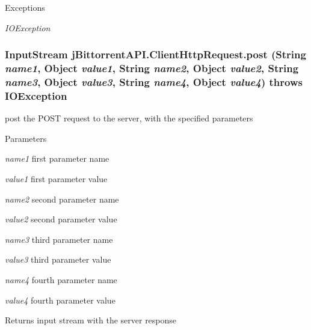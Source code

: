 \begin{DoxyExceptions}{Exceptions}
\item[{\em IOException}]\end{DoxyExceptions}
\hypertarget{classj_bittorrent_a_p_i_1_1_client_http_request_a56aa948898030309cc3989b6b57fcea7}{
\subsubsection[{post}]{\setlength{\rightskip}{0pt plus 5cm}InputStream jBittorrentAPI.ClientHttpRequest.post (String {\em name1}, \/  Object {\em value1}, \/  String {\em name2}, \/  Object {\em value2}, \/  String {\em name3}, \/  Object {\em value3}, \/  String {\em name4}, \/  Object {\em value4})  throws IOException }}
\label{classj_bittorrent_a_p_i_1_1_client_http_request_a56aa948898030309cc3989b6b57fcea7}
post the POST request to the server, with the specified parameters 
\begin{DoxyParams}{Parameters}
\item[{\em name1}]first parameter name \item[{\em value1}]first parameter value \item[{\em name2}]second parameter name \item[{\em value2}]second parameter value \item[{\em name3}]third parameter name \item[{\em value3}]third parameter value \item[{\em name4}]fourth parameter name \item[{\em value4}]fourth parameter value \end{DoxyParams}
\begin{DoxyReturn}{Returns}
input stream with the server response 
\end{DoxyReturn}

